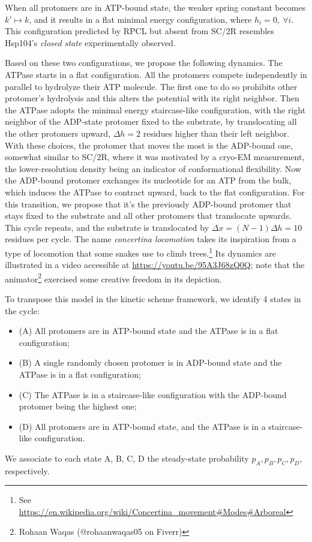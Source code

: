     When all protomers are in ATP-bound state, the weaker spring constant becomes $k'\mapsto k$, and it results in a flat minimal energy configuration, where $h_i = 0, \: \forall i$. This configuration predicted by RPCL but absent from SC/2R resembles Hsp104's \emph{closed state} experimentally observed\cite{shorter_spiraling_2019}. 
    
    Based on these two configurations, we propose the following dynamics. The ATPase starts in a flat configuration. All the protomers compete independently in parallel to hydrolyze their ATP molecule. The first one to do so prohibits other protomer's hydrolysis and this alters the potential with its right neighbor. Then the ATPase adopts the minimal energy staircase-like configuration, with the right neighbor of the ADP-state protomer fixed to the substrate, by translocating all the other protomers upward, $\Delta h = 2$ residues higher than their left neighbor. With these choices, the protomer that moves the most is the ADP-bound one, somewhat similar to SC/2R, where it was motivated by a cryo-EM measurement, the lower-resolution density being an indicator of conformational flexibility\cite{shorter_spiraling_2019}. Now the ADP-bound protomer exchanges its nucleotide for an ATP from the bulk, which induces the ATPase to contract upward, back to the flat configuration. For this transition, we propose that it's the previously ADP-bound protomer that stays fixed to the substrate and all other protomers that translocate upwards. This cycle repeats, and the substrate is translocated by $\Delta x = (N-1)\Delta h = 10$ residues per cycle. The name \emph{concertina locomotion} takes its inspiration from a type of locomotion that some snakes use to climb trees.\footnote{See \url{https://en.wikipedia.org/wiki/Concertina_movement\#Modes\#Arboreal}} Its dynamics are illustrated in a video accessible at \url{https://youtu.be/95A3J68zQ0Q}; note that the animator\footnote{Rohaan Waqas (@rohaanwaqas05 on Fiverr)} exercised some creative freedom in its depiction.
    
    To transpose this model in the kinetic scheme framework, we identify 4 states in the cycle:
    \begin{itemize}
        \item (A) All protomers are in ATP-bound state and the ATPase is in a flat configuration;
        \item (B) A single randomly chosen protomer is in ADP-bound state and the ATPase is in a flat configuration;
        \item (C) The ATPase is in a staircase-like configuration with the ADP-bound protomer being the highest one;
        \item (D) All protomers are in ATP-bound state, and the ATPase is in a staircase-like configuration.
    \end{itemize}
    We associate to each state A, B, C, D the steady-state probability $p_A, p_B, p_C, p_D$, respectively. 
    
